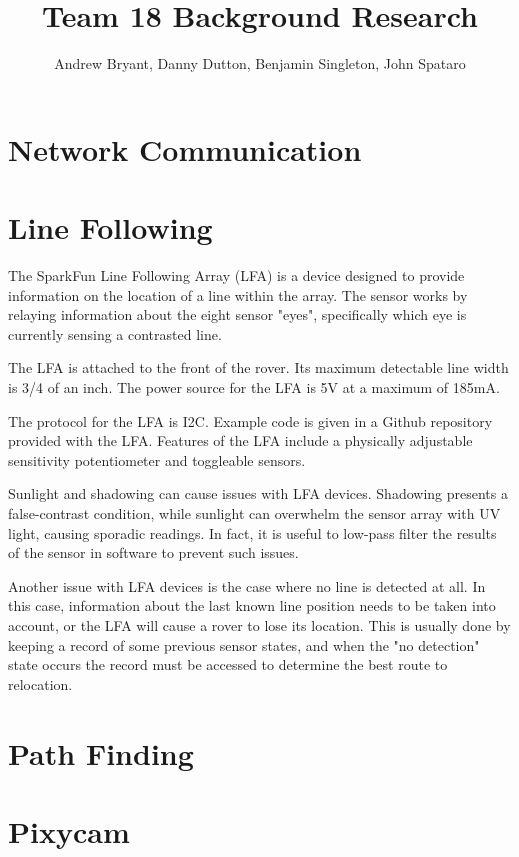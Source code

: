 \documentclass[12pt,letterpaper]{article}
\author{Andrew Bryant, Danny Dutton, Benjamin Singleton, John Spataro}
\title{Team 18 Background Research}
\begin{document}
\maketitle

\section{Network Communication}

\section{Line Following}
The SparkFun Line Following Array (LFA) is a device designed to provide information on the location of a line within the array. The sensor works by relaying information about the eight sensor "eyes", specifically which eye is currently sensing a contrasted line. 

The LFA is attached to the front of the rover. Its maximum detectable line width is 3/4 of an inch. The power source for the LFA is 5V at a maximum of 185mA. 

The protocol for the LFA is I2C. Example code is given in a Github repository provided with the LFA. Features of the LFA include a physically adjustable sensitivity potentiometer and toggleable sensors. 

Sunlight and shadowing can cause issues with LFA devices. Shadowing presents a false-contrast condition, while sunlight can overwhelm the sensor array with UV light, causing sporadic readings. In fact, it is useful to low-pass filter the results of the sensor in software to prevent such issues.

Another issue with LFA devices is the case where no line is detected at all. In this case, information about the last known line position needs to be taken into account, or the LFA will cause a rover to lose its location. This is usually done by keeping a record of some previous sensor states, and when the "no detection" state occurs the record must be accessed to determine the best route to relocation.



\section{Path Finding}

\section{Pixycam}
\end{document}
